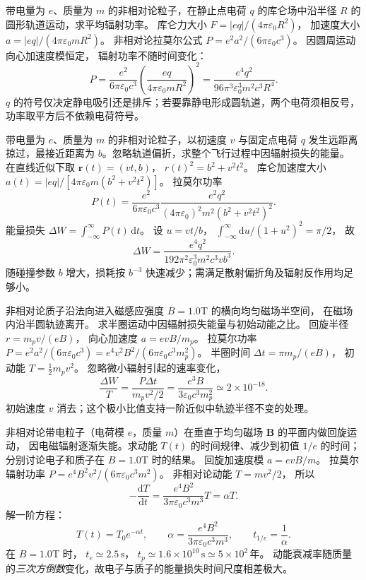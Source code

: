 带电量为 $e$、质量为 $m$ 的非相对论粒子，在静止点电荷 $q$ 的库仑场中沿半径 $R$ 的圆形轨道运动，求平均辐射功率。
\exsolution
库仑力大小
$F=|eq|/(4\pi\varepsilon_0R^2)$，
加速度大小
$a=|eq|/(4\pi\varepsilon_0mR^2)$。
非相对论拉莫尔公式
$P=e^2a^2/(6\pi\varepsilon_0c^3)$。
因圆周运动向心加速度模恒定，
辐射功率不随时间变化：
\[
\boxed{P=\frac{e^2}{6\pi\varepsilon_0c^3}
\left(\frac{eq}{4\pi\varepsilon_0mR^2}\right)^2
=\frac{e^4q^2}{96\pi^3\varepsilon_0^3m^2c^3R^4}}.
\]
\excheck $q$ 的符号仅决定静电吸引还是排斥；若要靠静电形成圆轨道，两个电荷须相反号，功率取平方后不依赖电荷符号。

带电量为 $e$、质量为 $m$ 的非相对论粒子，以初速度 $v$ 与固定点电荷 $q$ 发生远距离掠过，最接近距离为 $b$。忽略轨道偏折，求整个飞行过程中因辐射损失的能量。
\exsolution
在直线近似下取
$\bm r(t)=(vt,b)$，
$r(t)^2=b^2+v^2t^2$。
库仑加速度大小
$a(t)=|eq|/[4\pi\varepsilon_0m(b^2+v^2t^2)]$。
拉莫尔功率
\[
P(t)=\frac{e^2}{6\pi\varepsilon_0c^3}
\frac{e^2q^2}
{(4\pi\varepsilon_0)^2m^2(b^2+v^2t^2)^2}.
\]
能量损失
$\Delta W=\int_{-\infty}^{\infty}P(t)\,\mathrm dt$。
设 $u=vt/b$，
$\int_{-\infty}^{\infty}\mathrm du/(1+u^2)^2=\pi/2$，
故
\[
\boxed{\Delta W=
\frac{e^4q^2}{192\pi^2\varepsilon_0^3m^2c^3vb^3}}.
\]
\excheck 随碰撞参数 $b$ 增大，损耗按 $b^{-3}$ 快速减少；需满足散射偏折角及辐射反作用均足够小。

非相对论质子沿法向进入磁感应强度
$B=1.0$T 的横向均匀磁场半空间，
在磁场内沿半圆轨迹离开。
求半圈运动中因辐射损失能量与初始动能之比。
\exsolution
回旋半径 $r=m_pv/(eB)$，
向心加速度
$a=evB/m_p$。
拉莫尔功率
$P=e^2a^2/(6\pi\varepsilon_0c^3)
=e^4v^2B^2/(6\pi\varepsilon_0c^3m_p^2)$。
半圈时间
$\Delta t=\pi m_p/(eB)$，
初动能 $T=\tfrac12m_pv^2$。
忽略微小辐射引起的速率变化，
\[
\frac{\Delta W}{T}
=\frac{P\Delta t}{m_pv^2/2}
=\boxed{\frac{e^3B}{3\varepsilon_0c^3m_p^2}
\simeq2\times10^{-18}}.
\]
\excheck 初始速度 $v$ 消去；这个极小比值支持一阶近似中轨迹半径不变的处理。

非相对论带电粒子（电荷模 $e$，质量 $m$）在垂直于均匀磁场 $\bm B$ 的平面内做回旋运动，
因电磁辐射逐渐失能。求动能 $T(t)$ 的时间规律、减少到初值 $1/e$ 的时间；分别讨论电子和质子在 $B=1.0$T 时的结果。
\exsolution
回旋加速度模 $a=e vB/m$。
拉莫尔辐射功率
$P=e^4B^2v^2/(6\pi\varepsilon_0c^3m^2)$。
非相对论动能 $T=mv^2/2$，
所以
\[
-\frac{\mathrm dT}{\mathrm dt}
=\frac{e^4B^2}{3\pi\varepsilon_0c^3m^3}T
=\alpha T.
\]
解一阶方程：
\[
\boxed{T(t)=T_0e^{-\alpha t}},\qquad
\boxed{\alpha=\frac{e^4B^2}{3\pi\varepsilon_0c^3m^3}},
\qquad
\boxed{t_{1/e}=\frac1\alpha}.
\]
在 $B=1.0$T 时，
$\boxed{t_e\simeq2.5\,\mathrm s}$，
$\boxed{t_p\simeq1.6\times10^{10}\,\mathrm s
\simeq5\times10^2\,\text{年}}$。
\excheck 动能衰减率随质量的\emph{三次方倒数}变化，故电子与质子的能量损失时间尺度相差极大。

